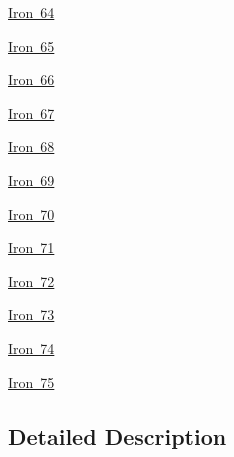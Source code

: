 \begin{DoxyCompactItemize}
\mbox{\hyperlink{group___isotope_const-_iron-_fe64}{Iron 64}}
\item 
\mbox{\hyperlink{group___isotope_const-_iron-_fe65}{Iron 65}}
\item 
\mbox{\hyperlink{group___isotope_const-_iron-_fe66}{Iron 66}}
\item 
\mbox{\hyperlink{group___isotope_const-_iron-_fe67}{Iron 67}}
\item 
\mbox{\hyperlink{group___isotope_const-_iron-_fe68}{Iron 68}}
\item 
\mbox{\hyperlink{group___isotope_const-_iron-_fe69}{Iron 69}}
\item 
\mbox{\hyperlink{group___isotope_const-_iron-_fe70}{Iron 70}}
\item 
\mbox{\hyperlink{group___isotope_const-_iron-_fe71}{Iron 71}}
\item 
\mbox{\hyperlink{group___isotope_const-_iron-_fe72}{Iron 72}}
\item 
\mbox{\hyperlink{group___isotope_const-_iron-_fe73}{Iron 73}}
\item 
\mbox{\hyperlink{group___isotope_const-_iron-_fe74}{Iron 74}}
\item 
\mbox{\hyperlink{group___isotope_const-_iron-_fe75}{Iron 75}}
\end{DoxyCompactItemize}


\subsection{Detailed Description}
